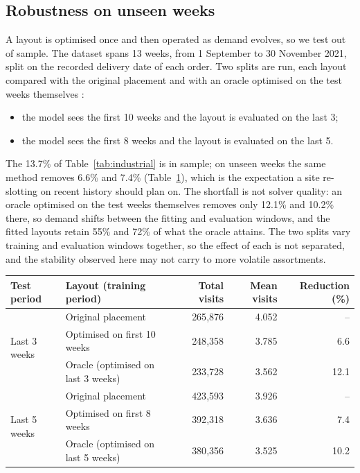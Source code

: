 \documentclass[]{interact}
\begin{document}
\subsection{Robustness on unseen weeks}\label{sec:temporal}
A layout is optimised once and then operated as demand evolves, so we test out of sample. The dataset spans 13 weeks, from 1 September to 30 November 2021, split on the recorded delivery date of each order. Two splits are run, each layout compared with the original placement and with an oracle optimised on the test weeks themselves \citep{lee2020cie, wang2020}:
\begin{itemize}
\item the model sees the first 10 weeks and the layout is evaluated on the last 3;
\item the model sees the first 8 weeks and the layout is evaluated on the last 5.
\end{itemize}

The 13.7\% of Table~\ref{tab:industrial} is in sample; on unseen weeks the same method removes 6.6\% and 7.4\% (Table~\ref{tab:temporal}), which is the expectation a site re-slotting on recent history should plan on. The shortfall is not solver quality: an oracle optimised on the test weeks themselves removes only 12.1\% and 10.2\% there, so demand shifts between the fitting and evaluation windows, and the fitted layouts retain 55\% and 72\% of what the oracle attains. The two splits vary training and evaluation windows together, so the effect of each is not separated, and the stability observed here may not carry to more volatile assortments.

\begin{table}[H]
\centering
{}
{\begin{tabular*}{\textwidth}{@{\extracolsep{\fill}}llrrr@{}}
\toprule
Test period & Layout (training period) & Total visits & Mean visits & Reduction (\%) \\
\midrule
\multirow{3}{*}{Last 3 weeks}
 & Original placement & 265{,}876 & 4.052 & -- \\
 & Optimised on first 10 weeks & 248{,}358 & 3.785 & 6.6 \\
 & Oracle (optimised on last 3 weeks) & 233{,}728 & 3.562 & 12.1 \\
\midrule
\multirow{3}{*}{Last 5 weeks}
 & Original placement & 423{,}593 & 3.926 & -- \\
 & Optimised on first 8 weeks & 392{,}318 & 3.636 & 7.4 \\
 & Oracle (optimised on last 5 weeks) & 380{,}356 & 3.525 & 10.2 \\
\bottomrule
\end{tabular*}}
\label{tab:temporal}
\end{table}
\end{document}
